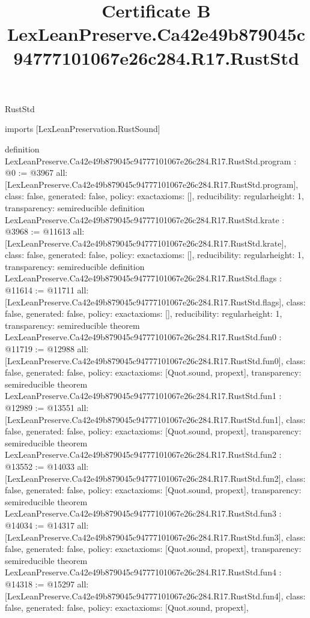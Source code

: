 \begin{lexlean}{RustStd}
\title{Certificate B LexLeanPreserve.Ca42e49b879045c94777101067e26c284.R17.RustStd}
\begin{coremodule}
imports [LexLeanPreservation.RustSound]

definition LexLeanPreserve.Ca42e49b879045c94777101067e26c284.R17.RustStd.program : @0 := @3967 {
  all: [LexLeanPreserve.Ca42e49b879045c94777101067e26c284.R17.RustStd.program],
  class: false,
  generated: false,
  policy: exact{axioms: []},
  reducibility: regular{height: 1},
  transparency: semireducible
}
definition LexLeanPreserve.Ca42e49b879045c94777101067e26c284.R17.RustStd.krate : @3968 := @11613 {
  all: [LexLeanPreserve.Ca42e49b879045c94777101067e26c284.R17.RustStd.krate],
  class: false,
  generated: false,
  policy: exact{axioms: []},
  reducibility: regular{height: 1},
  transparency: semireducible
}
definition LexLeanPreserve.Ca42e49b879045c94777101067e26c284.R17.RustStd.flags : @11614 := @11711 {
  all: [LexLeanPreserve.Ca42e49b879045c94777101067e26c284.R17.RustStd.flags],
  class: false,
  generated: false,
  policy: exact{axioms: []},
  reducibility: regular{height: 1},
  transparency: semireducible
}
theorem LexLeanPreserve.Ca42e49b879045c94777101067e26c284.R17.RustStd.fun0 : @11719 := @12988 {
  all: [LexLeanPreserve.Ca42e49b879045c94777101067e26c284.R17.RustStd.fun0],
  class: false,
  generated: false,
  policy: exact{axioms: [Quot.sound, propext]},
  transparency: semireducible
}
theorem LexLeanPreserve.Ca42e49b879045c94777101067e26c284.R17.RustStd.fun1 : @12989 := @13551 {
  all: [LexLeanPreserve.Ca42e49b879045c94777101067e26c284.R17.RustStd.fun1],
  class: false,
  generated: false,
  policy: exact{axioms: [Quot.sound, propext]},
  transparency: semireducible
}
theorem LexLeanPreserve.Ca42e49b879045c94777101067e26c284.R17.RustStd.fun2 : @13552 := @14033 {
  all: [LexLeanPreserve.Ca42e49b879045c94777101067e26c284.R17.RustStd.fun2],
  class: false,
  generated: false,
  policy: exact{axioms: [Quot.sound, propext]},
  transparency: semireducible
}
theorem LexLeanPreserve.Ca42e49b879045c94777101067e26c284.R17.RustStd.fun3 : @14034 := @14317 {
  all: [LexLeanPreserve.Ca42e49b879045c94777101067e26c284.R17.RustStd.fun3],
  class: false,
  generated: false,
  policy: exact{axioms: [Quot.sound, propext]},
  transparency: semireducible
}
theorem LexLeanPreserve.Ca42e49b879045c94777101067e26c284.R17.RustStd.fun4 : @14318 := @15297 {
  all: [LexLeanPreserve.Ca42e49b879045c94777101067e26c284.R17.RustStd.fun4],
  class: false,
  generated: false,
  policy: exact{axioms: [Quot.sound, propext]},
}
\end{coremodule}
\end{lexlean}
